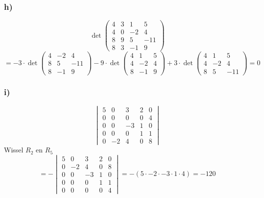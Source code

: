 \documentclass[lineaire_algebra_oplossingen.tex]{subfiles}
\begin{document}
\subsubsection*{h)}
\[ \det
\begin{pmatrix}
4 & 3 & 1 & 5\\
4 & 0 & -2 & 4\\
8 & 9 & 5 & -11\\
8 & 3 & -1 & 9
\end{pmatrix}
\]
\[ = -3 \cdot \det
\begin{pmatrix}
4 & -2 & 4\\
8 & 5 & -11\\
8 & -1 & 9
\end{pmatrix}
-9 \cdot \det 
\begin{pmatrix}
4 & 1 & 5\\
4 & -2 & 4\\
8 & -1 & 9
\end{pmatrix}
+3 \cdot \det
\begin{pmatrix}
4 & 1 & 5\\
4 & -2 & 4\\
8 & 5 & -11
\end{pmatrix}
= 0
\]

\subsubsection*{i)}
\[
\begin{vmatrix}
5 & 0 & 3 & 2 & 0\\
0 & 0 & 0 & 0 & 4\\
0 & 0 & -3  & 1 & 0\\
0 & 0 & 0 & 1 & 1\\
0 & -2 & 4 &0  &8
\end{vmatrix}
\]
Wissel $R_2$ en $R_5$
\[
=-
\begin{vmatrix}
5 & 0 & 3 & 2 & 0\\
0 & -2 & 4 &0  &8\\
0 & 0 & -3  & 1 & 0\\
0 & 0 & 0 & 1 & 1\\
0 & 0 & 0 & 0 & 4
\end{vmatrix}
= - (5 \cdot -2 \cdot -3 \cdot 1 \cdot 4) = -120
\]
\end{document}
